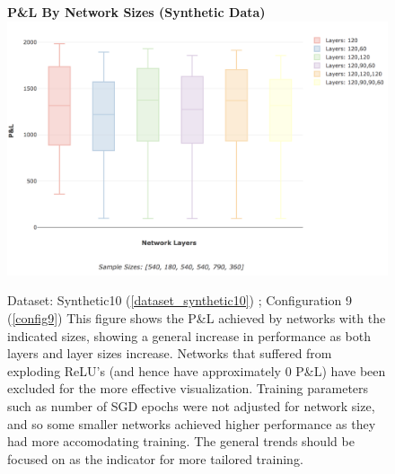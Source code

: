 \documentclass[a4paper,11pt,oneside]{article}
\theoremstyle{plain}
\theoremstyle{definition}
\begin{document}
	\begin{figure}[H]
		\centering 
		\textbf{P\&L By Network Sizes (Synthetic Data)}
		\includegraphics[scale=0.3]{images/results/network/synth_pl_box.png} 
		\caption[P\&L By Network Sizes (Synthetic Data)]{Dataset: Synthetic10 (\ref{dataset_synthetic10}) ; Configuration 9 (\ref{config9})
			\newline This figure shows the P\&L achieved by networks with the indicated sizes, showing a general increase in performance as both layers and layer sizes increase. Networks that suffered from exploding ReLU's (and hence have approximately 0 P\&L) have been excluded for the more effective visualization. Training parameters such as number of SGD epochs were not adjusted for network size, and so some smaller networks achieved higher performance as they had more accomodating training. The general trends should be focused on as the indicator for more tailored training.}
		\label{figure-results_synth_pl_box}
	\end{figure}
	
\end{document}
